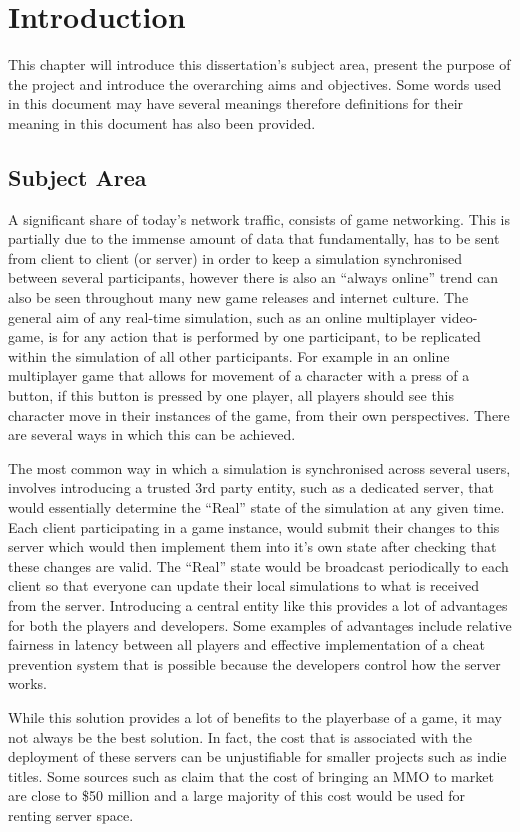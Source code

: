 \chapter{Introduction}
This chapter will introduce this dissertation's subject area, present the purpose of the project and introduce the overarching aims and objectives. Some words used in this document may have several meanings therefore definitions for their meaning in this document has also been provided.


\section{Subject Area}
A significant share of today's network traffic, consists of game networking. This is partially due to the immense amount of data that fundamentally, has to be sent from client to client (or server) in order to keep a simulation synchronised between several participants, however there is also an ``always online'' trend can also be seen throughout many new game releases and internet culture. The general aim of any real-time simulation, such as an online multiplayer video-game, is for any action that is performed by one participant, to be replicated within the simulation of all other participants. For example in an online multiplayer game that allows for movement of a character with a press of a button, if this button is pressed by one player, all players should see this character move in their instances of the game, from their own perspectives. There are several ways in which this can be achieved.

The most common way in which a simulation is synchronised across several users, involves introducing a trusted 3rd party entity, such as a dedicated server, that would essentially determine the ``Real'' state of the simulation at any given time. Each client participating in a game instance, would submit their changes to this server which would then implement them into it's own state after checking that these changes are valid. The ``Real'' state would be broadcast periodically to each client so that everyone can update their local simulations to what is received from the server. Introducing a central entity like this provides a lot of advantages for both the players and developers. Some examples of advantages include relative fairness in latency between all players and effective implementation of a cheat prevention system that is possible because the developers control how the server works.

While this solution provides a lot of benefits to the playerbase of a game, it may not always be the best solution. In fact, the cost that is associated with the deployment of these servers can be unjustifiable for smaller projects such as indie titles. Some sources such as  claim that the cost of bringing an MMO to market are close to \$50 million and a large majority of this cost would be used for renting server space.

